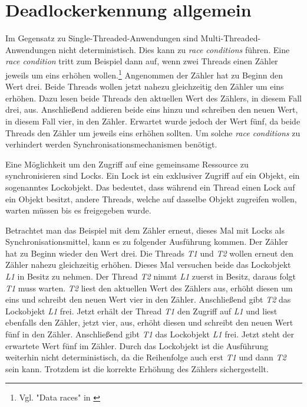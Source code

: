 \section{Deadlockerkennung allgemein}
\label{section:Deadlockerkennung allgemein}
Im Gegensatz zu Single-Threaded-Anwendungen sind Multi-Threaded-Anwendungen
nicht deterministisch. Dies kann zu \emph{race conditions} führen. Eine
\emph{race condition} tritt zum Beispiel dann auf, wenn zwei Threads einen
Zähler jeweils um eins erhöhen wollen.\footnote{Vgl. "Data races" in
\autocite[70]{netzer1992race}} Angenommen der Zähler hat zu Beginn den Wert
drei. Beide Threads wollen jetzt nahezu gleichzeitig den Zähler um eins erhöhen.
Dazu lesen beide Threads den aktuellen Wert des Zählers, in diesem Fall drei,
aus. Anschließend addieren beide eins hinzu und schreiben den neuen Wert, in
diesem Fall vier, in den Zähler. Erwartet wurde jedoch der Wert fünf, da beide
Threads den Zähler um jeweils eins erhöhen sollten. Um solche \emph{race
conditions} zu verhindert werden Synchronisationsmechanismen benötigt.

Eine Möglichkeit um den Zugriff auf eine gemeinsame Ressource zu synchronisieren
sind Locks. Ein Lock ist ein exklusiver Zugriff auf ein Objekt, ein sogenanntes
Lockobjekt. Das bedeutet, dass während ein Thread einen Lock auf ein Objekt
besitzt, andere Threads, welche auf dasselbe Objekt zugreifen wollen, warten
müssen bis es freigegeben wurde.

Betrachtet man das Beispiel mit dem Zähler erneut, dieses Mal mit Locks als
Synchronisationsmittel, kann es zu folgender Ausführung kommen. Der Zähler hat
zu Beginn wieder den Wert drei. Die Threads \emph{T1} und \emph{T2} wollen
erneut den Zähler nahezu gleichzeitig erhöhen. Dieses Mal versuchen beide das
Lockobjekt \emph{L1} in Besitz zu nehmen. Der Thread \emph{T2} nimmt
\emph{L1} zuerst in Besitz, daraus folgt \emph{T1} muss warten. \emph{T2}
liest den aktuellen Wert des Zählers aus, erhöht diesen um eins und schreibt den
neuen Wert vier in den Zähler. Anschließend gibt \emph{T2} das Lockobjekt
\emph{L1} frei. Jetzt erhält der Thread \emph{T1} den Zugriff auf \emph{L1} und
liest ebenfalls den Zähler, jetzt vier, aus, erhöht diesen und schreibt den
neuen Wert fünf in den Zähler. Anschließend gibt \emph{T1} das Lockobjekt
\emph{L1} frei. Jetzt steht der erwartete Wert fünf im Zähler. Durch das
Lockobjekt ist die Ausführung weiterhin nicht deterministisch, da die
Reihenfolge auch erst \emph{T1} und dann \emph{T2} sein kann. Trotzdem ist die
korrekte Erhöhung des Zählers sichergestellt.

